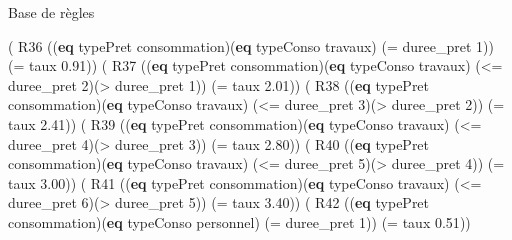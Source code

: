 \documentclass[
  ignorenonframetext,
]{beamer}
\newenvironment{Shaded}{}{}
\newcommand{\DecValTok}[1]{\textcolor[rgb]{0.25,0.63,0.44}{#1}}
\newcommand{\FloatTok}[1]{\textcolor[rgb]{0.25,0.63,0.44}{#1}}
\newcommand{\KeywordTok}[1]{\textcolor[rgb]{0.00,0.44,0.13}{\textbf{#1}}}
\newcommand{\NormalTok}[1]{#1}
\newcommand{\OperatorTok}[1]{\textcolor[rgb]{0.40,0.40,0.40}{#1}}
\begin{document}
\begin{frame}[fragile]{Base de règles}
\protect\hypertarget{base-de-ruxe8gles-4}{}
\begin{Shaded}
\begin{Highlighting}[]
\NormalTok{( R36 ((}\KeywordTok{eq}\NormalTok{ typePret consommation)(}\KeywordTok{eq}\NormalTok{ typeConso travaux)}
\NormalTok{        (}\OperatorTok{=}\NormalTok{ duree\_pret }\DecValTok{1}\NormalTok{)) (}\OperatorTok{=}\NormalTok{ taux }\FloatTok{0.91}\NormalTok{))}
\NormalTok{( R37 ((}\KeywordTok{eq}\NormalTok{ typePret consommation)(}\KeywordTok{eq}\NormalTok{ typeConso travaux)}
\NormalTok{        (}\OperatorTok{\textless{}=}\NormalTok{ duree\_pret }\DecValTok{2}\NormalTok{)(}\OperatorTok{\textgreater{}}\NormalTok{ duree\_pret }\DecValTok{1}\NormalTok{)) (}\OperatorTok{=}\NormalTok{ taux }\FloatTok{2.01}\NormalTok{))}
\NormalTok{( R38 ((}\KeywordTok{eq}\NormalTok{ typePret consommation)(}\KeywordTok{eq}\NormalTok{ typeConso travaux)}
\NormalTok{        (}\OperatorTok{\textless{}=}\NormalTok{ duree\_pret }\DecValTok{3}\NormalTok{)(}\OperatorTok{\textgreater{}}\NormalTok{ duree\_pret }\DecValTok{2}\NormalTok{)) (}\OperatorTok{=}\NormalTok{ taux }\FloatTok{2.41}\NormalTok{))}
\NormalTok{( R39 ((}\KeywordTok{eq}\NormalTok{ typePret consommation)(}\KeywordTok{eq}\NormalTok{ typeConso travaux)}
\NormalTok{        (}\OperatorTok{\textless{}=}\NormalTok{ duree\_pret }\DecValTok{4}\NormalTok{)(}\OperatorTok{\textgreater{}}\NormalTok{ duree\_pret }\DecValTok{3}\NormalTok{)) (}\OperatorTok{=}\NormalTok{ taux }\FloatTok{2.80}\NormalTok{))}
\NormalTok{( R40 ((}\KeywordTok{eq}\NormalTok{ typePret consommation)(}\KeywordTok{eq}\NormalTok{ typeConso travaux)}
\NormalTok{        (}\OperatorTok{\textless{}=}\NormalTok{ duree\_pret }\DecValTok{5}\NormalTok{)(}\OperatorTok{\textgreater{}}\NormalTok{ duree\_pret }\DecValTok{4}\NormalTok{)) (}\OperatorTok{=}\NormalTok{ taux }\FloatTok{3.00}\NormalTok{))}
\NormalTok{( R41 ((}\KeywordTok{eq}\NormalTok{ typePret consommation)(}\KeywordTok{eq}\NormalTok{ typeConso travaux)}
\NormalTok{        (}\OperatorTok{\textless{}=}\NormalTok{ duree\_pret }\DecValTok{6}\NormalTok{)(}\OperatorTok{\textgreater{}}\NormalTok{ duree\_pret }\DecValTok{5}\NormalTok{)) (}\OperatorTok{=}\NormalTok{ taux }\FloatTok{3.40}\NormalTok{))}
\NormalTok{( R42 ((}\KeywordTok{eq}\NormalTok{ typePret consommation)(}\KeywordTok{eq}\NormalTok{ typeConso personnel)}
\NormalTok{        (}\OperatorTok{=}\NormalTok{ duree\_pret }\DecValTok{1}\NormalTok{)) (}\OperatorTok{=}\NormalTok{ taux }\FloatTok{0.51}\NormalTok{))}
\end{Highlighting}
\end{Shaded}
\end{frame}
\end{document}
